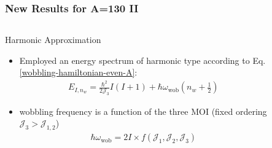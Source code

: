 \documentclass{beamer}
\begin{document}
\begin{frame}
  \frametitle{New Results for A=130 II}
  \begin{columns}
    \begin{column}{0.8\textwidth}
      \begin{alertblock}{Harmonic Approximation}
        \begin{itemize}
          \item Employed an energy spectrum of harmonic type according to Eq. \ref{wobbling-hamiltonian-even-A}:
          \begin{align}
            E_{I,n_w}=\frac{\hbar^2}{2\mathcal{J}_3}I(I+1)+\hbar\omega_\text{wob}(n_w+\frac{1}{2})
          \end{align}
          \item wobbling frequency is a function of the three MOI (fixed ordering $\mathcal{J}_3>\mathcal{J}_{1,2}$)
          \begin{align}
            \hbar\omega_\text{wob}=2I\times f(\mathcal{J}_1,\mathcal{J}_2,\mathcal{J}_3)
          \end{align}
        \end{itemize}
      \end{alertblock}
  \end{column}
  \begin{column}{0.2\textwidth}
    \begin{figure}
      \centering

\end{figure}
\end{column}
\end{columns}
\end{frame}
\end{document}
